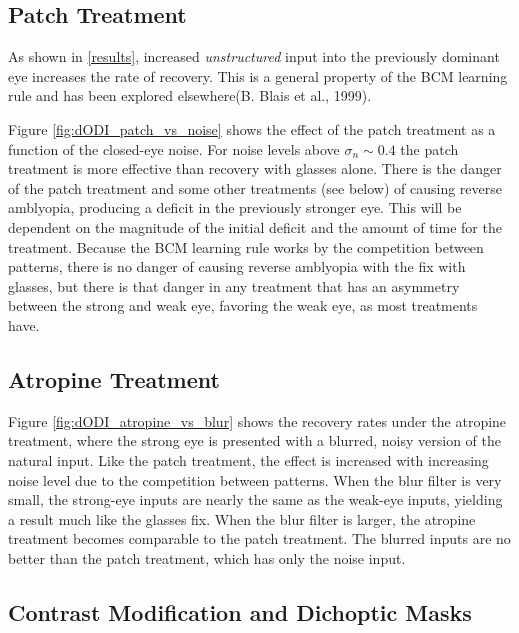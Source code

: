 \documentclass[
  onecolumn]{article}
\begin{document}
\hypertarget{patch-treatment-1}{%
\subsection{Patch Treatment}\label{patch-treatment-1}}

As shown in \ref{results}, increased \emph{unstructured} input into the
previously dominant eye increases the rate of recovery. This is a
general property of the BCM learning rule and has been explored
elsewhere(B. Blais et al., 1999).

Figure \ref{fig:dODI_patch_vs_noise} shows the effect of the patch
treatment as a function of the closed-eye noise. For noise levels above
\(\sigma_n \sim 0.4\) the patch treatment is more effective than
recovery with glasses alone. There is the danger of the patch treatment
and some other treatments (see below) of causing reverse amblyopia,
producing a deficit in the previously stronger eye. This will be
dependent on the magnitude of the initial deficit and the amount of time
for the treatment. Because the BCM learning rule works by the
competition between patterns, there is no danger of causing reverse
amblyopia with the fix with glasses, but there is that danger in any
treatment that has an asymmetry between the strong and weak eye,
favoring the weak eye, as most treatments have.

\hypertarget{atropine-treatment-1}{%
\subsection{Atropine Treatment}\label{atropine-treatment-1}}

Figure \ref{fig:dODI_atropine_vs_blur} shows the recovery rates under
the atropine treatment, where the strong eye is presented with a
blurred, noisy version of the natural input. Like the patch treatment,
the effect is increased with increasing noise level due to the
competition between patterns. When the blur filter is very small, the
strong-eye inputs are nearly the same as the weak-eye inputs, yielding a
result much like the glasses fix. When the blur filter is larger, the
atropine treatment becomes comparable to the patch treatment. The
blurred inputs are no better than the patch treatment, which has only
the noise input.

\hypertarget{contrast-modification-and-dichoptic-masks}{%
\subsection{Contrast Modification and Dichoptic
Masks}\label{contrast-modification-and-dichoptic-masks}}
\end{document}
